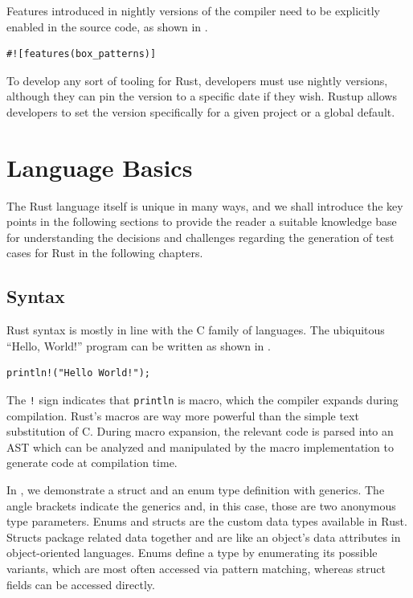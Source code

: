 \documentclass[paper=a4,%
  twoside,%
  BCOR4mm,%
  abstract=true,%
  toc=bibliography,%
  chapterprefix=true,%
  toc=bibliographynumbered,%
  open=right,%
  english,%
  pagesize=pdftex]{scrreprt}
\begin{document}
Features introduced in nightly versions of the compiler need to be explicitly enabled in the source code, as shown in .

\begin{lstlisting}[style=boxed, caption=Enabling features in Rust, label=lst:example-enable-feature]
#![features(box_patterns)]
\end{lstlisting}

To develop any sort of tooling for Rust, developers must use nightly versions, although they can pin the version to a specific date if they wish. Rustup allows developers to set the version specifically for a given project or a global default.

\section{Language Basics}
The Rust language itself is unique in many ways, and we shall introduce the key points in the following sections to provide the reader a suitable knowledge base for understanding the decisions and challenges regarding the generation of test cases for Rust in the following chapters.

\subsection{Syntax}
Rust syntax is mostly in line with the C family of languages. The ubiquitous ``Hello, World!'' program can be written as shown in .
\begin{lstlisting}[style=boxed, caption={The ``Hello World'' example written in Rust}, label=lst:example-hello-world]
println!("Hello World!");
\end{lstlisting}

The \texttt{!} sign indicates that \texttt{println} is macro, which the compiler expands during compilation. Rust's macros are way more powerful than the simple text substitution of C. During macro expansion, the relevant code is parsed into an \ac{AST} which can be analyzed and manipulated by the macro implementation to generate code at compilation time.

In , we demonstrate a struct and an enum type definition with generics. The angle brackets indicate the generics and, in this case, those are two anonymous type parameters. Enums and structs are the custom data types available in Rust. Structs package related data together and are like an object's data attributes in object-oriented languages. Enums define a type by enumerating its possible variants, which are most often accessed via pattern matching, whereas struct fields can be accessed directly.
\end{document}
